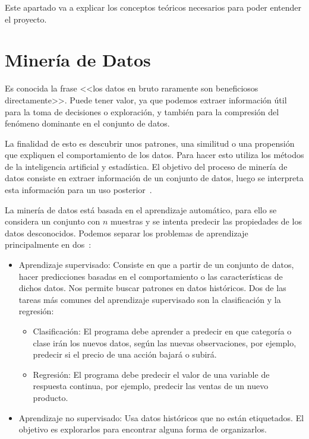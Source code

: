 
Este apartado va a explicar los conceptos teóricos necesarios para poder entender el proyecto.

\section{Minería de Datos}
Es conocida la frase <<los datos en bruto raramente son beneficiosos directamente>>. Puede tener valor, ya que podemos extraer información útil para la toma de decisiones o exploración, y también para la compresión del fenómeno dominante en el conjunto de datos.

La finalidad de esto es descubrir unos patrones, una similitud o una propensión que expliquen el comportamiento de los datos. Para hacer esto utiliza los métodos de la inteligencia artificial y estadística.
El objetivo del proceso de minería de datos consiste en extraer información de un conjunto de datos, luego se interpreta esta información para un uso posterior~\cite{wiki:datamining}.

La minería de datos está basada en el aprendizaje automático, para ello se considera un conjunto con $n$ muestras y se intenta predecir las propiedades de los datos desconocidos. Podemos separar los problemas de aprendizaje principalmente en dos~\cite{scikitlearn2}:
	\begin{itemize}
		\item Aprendizaje supervisado: Consiste en que a partir de un conjunto de datos, hacer predicciones basadas en el comportamiento o las características de dichos datos. Nos permite buscar patrones en datos históricos. Dos de las tareas más comunes del aprendizaje supervisado son la clasificación y la regresión:
		
		\begin{itemize}
		 	\item Clasificación: El programa debe aprender a predecir en que categoría o clase irán los nuevos datos, según las nuevas observaciones, por ejemplo, predecir si el precio de una acción bajará o subirá.
		 	\item Regresión: El programa debe predecir el valor de una variable de respuesta continua, por ejemplo, predecir las ventas de un nuevo producto.
		\end{itemize}
		
		\item Aprendizaje no supervisado: Usa datos históricos que no están etiquetados. El objetivo es explorarlos para encontrar alguna forma de organizarlos.
	\end{itemize}

